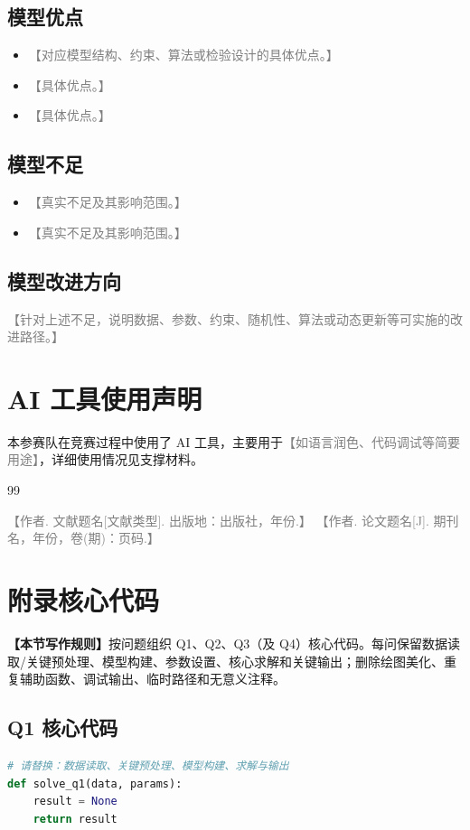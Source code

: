 \documentclass[UTF8,a4paper,12pt]{ctexart}
\numberwithin{equation}{section}
\newcommand{\writingrule}[1]{\par\noindent\begingroup\color{gray}\small\textbf{【本节写作规则】}#1\par\endgroup}
\newcommand{\placeholder}[1]{\textcolor{gray}{【#1】}}
\begin{document}
\subsection{模型优点}
\begin{itemize}[leftmargin=2em]
  \item \placeholder{对应模型结构、约束、算法或检验设计的具体优点。}
  \item \placeholder{具体优点。}
  \item \placeholder{具体优点。}
\end{itemize}
\subsection{模型不足}
\begin{itemize}[leftmargin=2em]
  \item \placeholder{真实不足及其影响范围。}
  \item \placeholder{真实不足及其影响范围。}
\end{itemize}
\subsection{模型改进方向}
\placeholder{针对上述不足，说明数据、参数、约束、随机性、算法或动态更新等可实施的改进路径。}

\clearpage
\section*{AI 工具使用声明}
本参赛队在竞赛过程中使用了 AI 工具，主要用于\placeholder{如语言润色、代码调试等简要用途}，详细使用情况见支撑材料。

\clearpage
\begin{thebibliography}{99}
 \placeholder{作者. 文献题名[文献类型]. 出版地：出版社，年份.}
 \placeholder{作者. 论文题名[J]. 期刊名，年份，卷(期)：页码.}
\end{thebibliography}

\clearpage
\appendix
\section{附录核心代码}
\writingrule{按问题组织 Q1、Q2、Q3（及 Q4）核心代码。每问保留数据读取/关键预处理、模型构建、参数设置、核心求解和关键输出；删除绘图美化、重复辅助函数、调试输出、临时路径和无意义注释。}
\subsection{Q1 核心代码}
\begin{lstlisting}[language=Python,caption={问题一核心代码示例}]
# 请替换：数据读取、关键预处理、模型构建、求解与输出
def solve_q1(data, params):
    result = None
    return result
\end{lstlisting}
\end{document}
